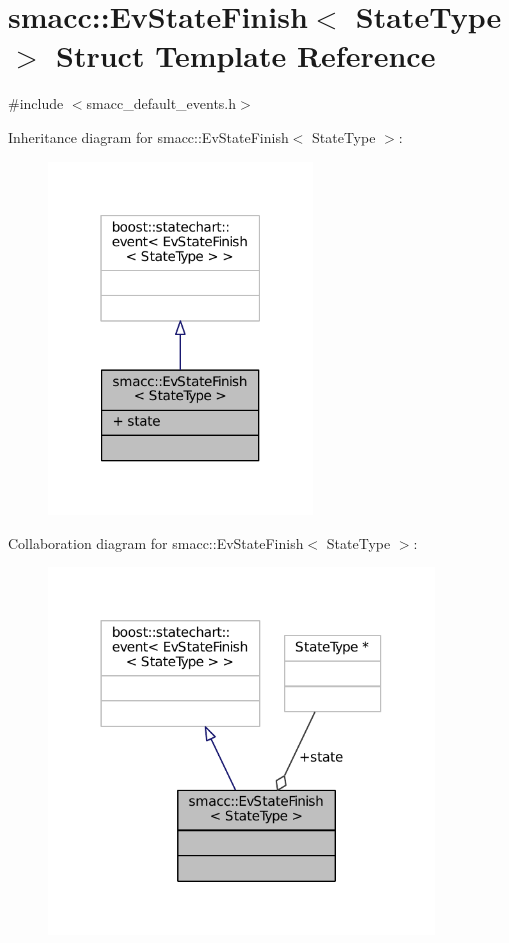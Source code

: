 \hypertarget{structsmacc_1_1EvStateFinish}{}\section{smacc\+:\+:Ev\+State\+Finish$<$ State\+Type $>$ Struct Template Reference}
\label{structsmacc_1_1EvStateFinish}


{\ttfamily \#include $<$smacc\+\_\+default\+\_\+events.\+h$>$}



Inheritance diagram for smacc\+:\+:Ev\+State\+Finish$<$ State\+Type $>$\+:
\nopagebreak
\begin{figure}[H]
\begin{center}
\leavevmode
\includegraphics[width=199pt]{structsmacc_1_1EvStateFinish__inherit__graph}
\end{center}
\end{figure}


Collaboration diagram for smacc\+:\+:Ev\+State\+Finish$<$ State\+Type $>$\+:
\nopagebreak
\begin{figure}[H]
\begin{center}
\leavevmode
\includegraphics[width=290pt]{structsmacc_1_1EvStateFinish__coll__graph}
\end{center}
\end{figure}
